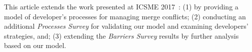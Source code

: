 This article extends the work presented at ICSME 2017~\cite{mckee2017software}:
(1) by providing a model of developer's processes for managing merge conflicts; 
(2) conducting an additional \emph{Processes Survey} for validating our model and examining developers' strategies, and; 
(3) extending the \emph{Barriers Survey} results by further analysis based on our model. 